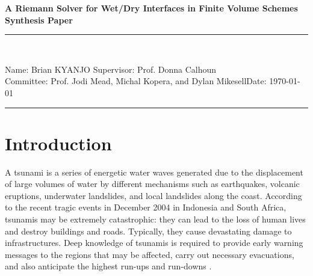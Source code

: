 \documentclass[9pt,a4paper]{article}
\newcommand{\student}{Brian KYANJO }
\newcommand{\course}{Prof. Jodi Mead, Michal Kopera, and Dylan Mikesell}
\newcommand{\assignment}{ Prof. Donna Calhoun}
\begin{document}
	
	\thispagestyle{empty}
	\begin{center}
		\textbf{A Riemann Solver for Wet/Dry Interfaces in Finite Volume Schemes\\[0.5cm]
			Synthesis Paper}
		\vspace{.2cm}
	\end{center}
	
	
	\begin{center}
		\rule{17cm}{0.2cm}\\[0.3cm]
	\end{center}	
	
	\noindent	Name: \student \hfill Supervisor: \assignment\\[0.1cm]
	Committee: \course \hfill Date: \today\\
	\rule{17cm}{0.05cm}
	\vspace{.2cm}
	
	\section{Introduction}
	
	A tsunami is a series of energetic water waves generated due to the displacement of large volumes of water by different mechanisms such as earthquakes, volcanic eruptions, underwater landslides, and local landslides along the coast. According to the recent tragic events in December 2004 in Indonesia and  South Africa, tsunamis may be extremely catastrophic: they can lead to the loss of human lives and destroy buildings and roads. Typically, they cause devastating damage to infrastructures. Deep knowledge of tsunamis is required to provide early warning messages to the regions that may be affected, carry out necessary evacuations, and also anticipate the highest run-ups and run-downs  \citep{sanchez2016uncertainty, dutykh2007water,dias2007dynamics}.
	
\end{document}
